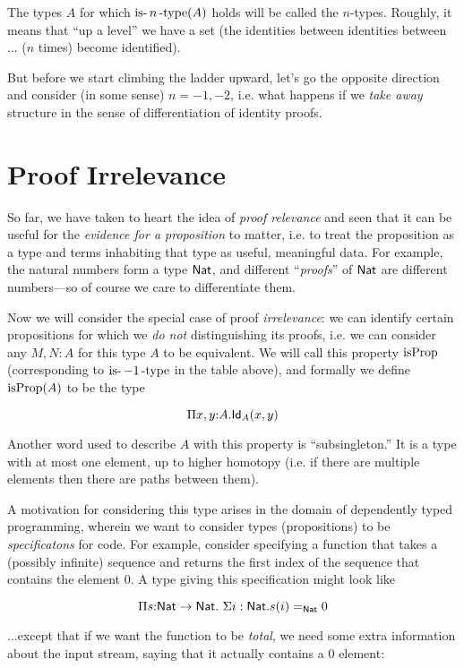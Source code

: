 \documentclass[11pt]{article}
\begin{document}
The types $A$ for which $\operatorname{is-}n\operatorname{-type}(A)$ holds will be called the
$n$-types. Roughly, it means that ``up a level'' we have a set (the
identities between identities between ... ($n$ times) become identified).

But before we start climbing the ladder upward, let's go the opposite
direction and consider (in some sense) $n=-1, -2$, i.e. what happens if we
{\em take away} structure in the sense of differentiation of identity
proofs.

\section{Proof Irrelevance}

So far, we have taken to heart the idea of {\em proof relevance} and seen
that it can be useful for the {\em evidence for a proposition} to matter,
i.e. to treat the proposition as a type and terms inhabiting that type as
useful, meaningful data. For example, the natural numbers form a type
$\mathsf{Nat}$, and different ``{\em proofs}'' of $\mathsf{Nat}$ are different
numbers---so of course we care to differentiate them.

Now we will consider the special case of proof {\em irrelevance}: we can
identify certain propositions for which we {\em do not}
distinguishing its proofs, i.e. we can consider any $M, N : A$ for this type
$A$ to be equivalent. We will call this property $\operatorname{isProp}$
(corresponding to $\operatorname{is-}-1\operatorname{-type}$ in the table above), and formally
we define $\operatorname{isProp}(A)$ to be the type

\[
\Pi{x,y}{:}A.\mathsf{Id}_{A}(x,y)
\]

Another word used to describe $A$ with this property is ``subsingleton.''
It is a type with at most one element, up to higher homotopy (i.e. if there
are multiple elements then there are paths between them).

A motivation for considering this type arises in the domain of dependently
typed programming, wherein we want to consider types (propositions) to be
{\em specificatons} for code. For example, consider specifying a function
that takes a (possibly infinite) sequence and returns the first index of
the sequence that contains the element $0$. A type giving this
specification might look like

\[
\Pi{s{:}\Nat\to\Nat}.\ \Sigma{i:\Nat}.s(i)=_{\Nat} 0
\]

...except that if we want the function to be {\em total}, we need some
extra information about the input stream, saying that it actually contains
a $0$ element:
\end{document}
